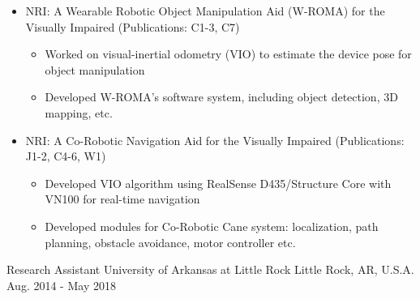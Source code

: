 \begin{cventries}
{%
      	  \vspace{-4.0mm}
      	\begin{justify}
      		\begin{itemize}[leftmargin=2ex, nosep, noitemsep]
      			\setlength{\parskip}{0pt}
      			\renewcommand{\labelitemi}{\bullet}
      			\item {NRI: A Wearable Robotic Object Manipulation Aid (W-ROMA) for the Visually Impaired (Publications: C1-3, C7)}
      			\begin{itemize}[leftmargin=3ex]
      				\scriptsize
      				\item {Worked on visual-inertial odometry (VIO) to estimate the device pose for object manipulation}
      				\item {Developed W-ROMA's software system, including object detection, 3D mapping, etc. }
      			\end{itemize}
      			\item {NRI: A Co-Robotic Navigation Aid for the Visually Impaired (Publications: J1-2, C4-6, W1)}
      			\begin{itemize}[leftmargin=3ex]
      				\scriptsize
      				\item {Developed VIO algorithm using RealSense D435/Structure Core with VN100 for real-time navigation}
      				\item {Developed modules for Co-Robotic Cane system: localization, path planning, obstacle avoidance, motor controller etc.}
      			\end{itemize}
      		\end{itemize}
      	\end{justify}
      	\vspace{-4.0mm}  
     }
  \cventry
    {Research Assistant} %
    {University of Arkansas at Little Rock} %
    {Little Rock, AR, U.S.A.} %
    {Aug. 2014 - May 2018} %
    {
    	  \vspace{-4.0mm}
 \begin{justify}
 	\begin{itemize}[leftmargin=2ex, nosep, noitemsep]

\end{itemize}
\end{justify}}
\end{cventries}
